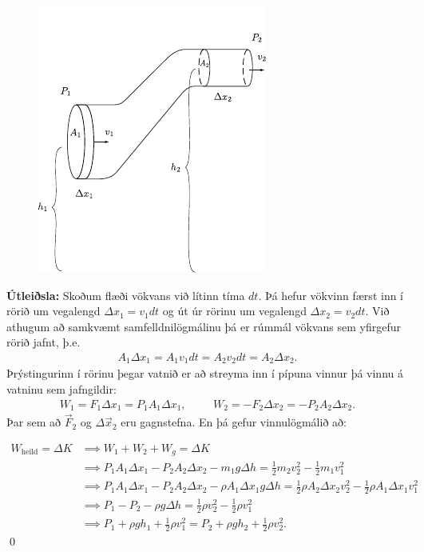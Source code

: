 \ifdefined \wholebook \else\documentclass[oneside]{book}\usepackage{EdlBook}\graphicspath{{figures/}}
\begin{document}
\begin{minipage}{\linewidth}
\begin{figure}
    \vspace{-1cm}
    \centering
    \includegraphics[scale = 1.2]{figures/bernoulli.pdf}
    \label{fig:bern}
\end{figure}

\textbf{Útleiðsla:} Skoðum flæði vökvans við lítinn tíma $dt$. Þá hefur vökvinn færst inn í rörið um vegalengd $\Delta x_1 = v_1 dt$ og út úr rörinu um vegalengd $\Delta x_2 = v_2 dt$. Við athugum að samkvæmt samfelldnilögmálinu þá er rúmmál vökvans sem yfirgefur rörið jafnt, þ.e.
\begin{align*}
     A_1 \Delta x_1 = A_1 v_1 dt = A_2 v_2 dt = A_2 \Delta x_2.
\end{align*}
Þrýstingurinn í rörinu þegar vatnið er að streyma inn í pípuna vinnur þá vinnu á vatninu sem jafngildir:
\begin{align*}
    W_1 = F_1 \Delta x_1 = P_1 A_1 \Delta x_1, \hspace{1cm} W_2 = -F_2 \Delta x_2 = -P_2 A_2 \Delta x_2.
\end{align*}
Þar sem að $\Vec{F}_2$ og $\Delta \Vec{x}_2$ eru gagnstefna. En þá gefur vinnulögmálið að:
\end{minipage}
\begin{align*}
    W_{\text{heild}} = \Delta K &\implies W_1 + W_2 + W_{g} = \Delta K \\
    &\implies P_1 A_1 \Delta x_1 - P_2A_2 \Delta x_2 - m_1g \Delta h = \frac{1}{2}m_2 v_2^2 - \frac{1}{2}m_1v_1^2 \\
    &\implies P_1 A_1 \Delta x_1 - P_2A_2 \Delta x_2 - \rho A_1 \Delta x_1 g \Delta h = \frac{1}{2} \rho A_2 \Delta x_2 v_2^2 - \frac{1}{2} \rho A_1 \Delta x_1 v_1^2 \\
    &\implies P_1 - P_2 - \rho g\Delta h = \frac{1}{2}\rho v_2^2 - \frac{1}{2}\rho v_1^2 \\
    &\implies P_1 + \rho g h_1 + \frac{1}{2}\rho v_1^2 = P_2 + \rho g h_2 + \frac{1}{2}\rho v_2^2.
\end{align*}
\qed
\end{document}
